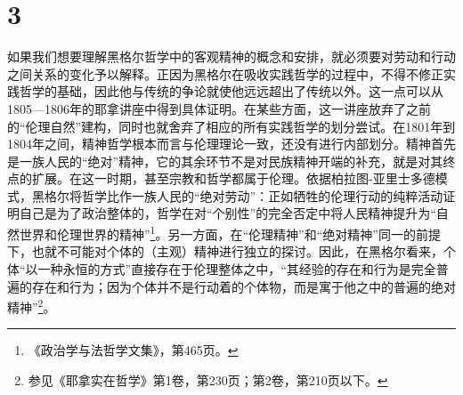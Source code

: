 \section*{3}

如果我们想要理解黑格尔哲学中的客观精神的概念和安排，就必须要对劳动和行动之间关系的变化予以解释。正因为黑格尔在吸收实践哲学的过程中，不得不修正实践哲学的基础，因此他与传统的争论就使他远远超出了传统以外。这一点可以从1805—1806年的耶拿讲座中得到具体证明。在某些方面，这一讲座放弃了之前的“伦理自然”建构，同时也就舍弃了相应的所有实践哲学的划分尝试。在1801年到1804年之间，精神哲学根本而言与伦理理论一致，还没有进行内部划分。精神首先是一族人民的“绝对”精神，它的其余环节不是对民族精神开端的补充，就是对其终点的扩展。在这一时期，甚至宗教和哲学都属于伦理。依据柏拉图-亚里士多德模式，黑格尔将哲学比作一族人民的“绝对劳动”：正如牺牲的伦理行动的纯粹活动证明自己是为了政治整体的，哲学在对“个别性”的完全否定中将人民精神提升为“自然世界和伦理世界的精神”\footnote{《政治学与法哲学文集》，第465页。}。另一方面，在“伦理精神”和“绝对精神”同一的前提下，也就不可能对个体的（主观）精神进行独立的探讨。因此，在黑格尔看来，个体“以一种永恒的方式”直接存在于伦理整体之中，“其经验的存在和行为是完全普遍的存在和行为；因为个体并不是行动着的个体物，而是寓于他之中的普遍的绝对精神”\footnote{参见《耶拿实在哲学》第1卷，第230页；第2卷，第210页以下。}。

